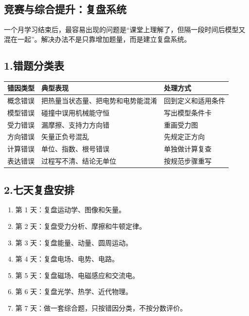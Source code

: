 \subsection*{竞赛与综合提升：复盘系统}

一个月学习结束后，最容易出现的问题是“课堂上理解了，但隔一段时间后模型又混在一起”。解决办法不是只靠增加题量，而是建立复盘系统。

\begin{center}


\label{fig:comprehensive-review-cycle}
\end{center}

\subsection*{1.\quad 错题分类表}

\begin{center}
\begin{tabular}{lll}
\toprule
错因类型 & 典型表现 & 处理方式 \\
\midrule
概念错误 & 把热量当状态量、把电势和电势能混淆 & 回到定义和适用条件 \\
模型错误 & 碰撞中误用机械能守恒 & 写出模型条件卡 \\
受力错误 & 漏摩擦、支持力方向错 & 重画受力图 \\
方向错误 & 矢量正负号混乱 & 先规定正方向 \\
计算错误 & 单位、指数、根号错误 & 单独做计算复查 \\
表达错误 & 过程写不清、结论无单位 & 按规范步骤重写 \\
\bottomrule
\end{tabular}
\end{center}

\subsection*{2.\quad 七天复盘安排}

\begin{enumerate}
  \item 第 1 天：复盘运动学、图像和矢量。
  \item 第 2 天：复盘受力分析、摩擦和牛顿定律。
  \item 第 3 天：复盘能量、动量、圆周运动。
  \item 第 4 天：复盘电场、电势、电路。
  \item 第 5 天：复盘磁场、电磁感应和交流电。
  \item 第 6 天：复盘光学、热学、近代物理。
  \item 第 7 天：做一套综合题，只按错因分类，不按分数评价。
\end{enumerate}


